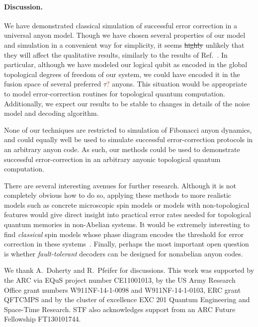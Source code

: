 \documentclass[aps, prl, letterpaper, twocolumn, superscriptaddress, notitlepage, 10pt]{revtex4}
\newcommand{\dude}[1]{\textcolor{red}{#1}}
\begin{document}
\paragraph{Discussion.}

We have demonstrated classical simulation of successful error correction in a universal anyon model. 
Though we have chosen several properties of our model and 
simulation in a convenient way for simplicity, it seems \sout{highly}
unlikely that they will affect the qualitative results, similarly to the results of Ref.~\cite{Brell2013}. 
In particular, although we have modeled our logical qubit as 
encoded in the global topological degrees of freedom of our 
system, we could have encoded it in the fusion space of several preferred $\tau$\dude{?} anyons. 
This situation would be appropriate to model error-correction routines for topological quantum computation. 
Additionally, we expect our results to be stable to changes in details of the noise model and decoding algorithm.

None of our techniques are restricted to simulation of Fibonacci anyon dynamics, and could 
equally well be used to simulate successful error-correction protocols in an arbitrary anyon code. 
As such, our methods could be used to demonstrate successful 
error-correction in an arbitrary anyonic topological quantum computation.

There are several interesting avenues for further research. 
Although it is not completely obvious how to do so, 
applying these methods to more realistic models such as concrete 
microscopic spin models or models with non-topological features would give 
direct insight into practical error rates needed for topological quantum memories in non-Abelian systems. 
It would be extremely interesting to find \emph{classical} spin models 
whose phase diagram encodes the threshold for error correction in these systems~\cite{Dennis2002}.
Finally, perhaps the most important open question is whether 
\emph{fault-tolerant} decoders can be designed for nonabelian anyon codes. 


\acknowledgments 

We thank A.\ Doherty and R.\ Pfeifer for discussions. 
This work was supported by the ARC via EQuS project number CE11001013, by the US Army Research Office grant numbers W911NF-14-1-0098 and W911NF-14-1-0103, ERC grant QFTCMPS and by the cluster of excellence EXC 201 Quantum Engineering and Space-Time Research. STF also acknowledges support from an ARC Future Fellowship FT130101744.


\end{document}
